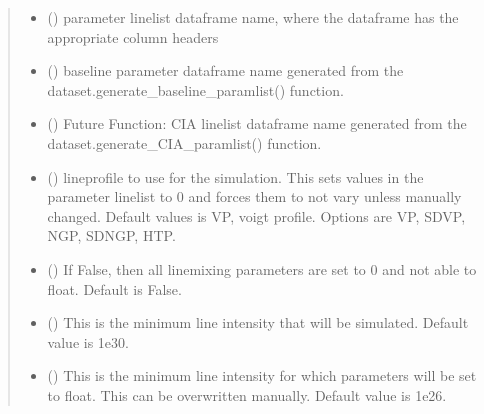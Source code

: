 \documentclass[letterpaper,10pt,english]{sphinxmanual}
\begin{document}
\begin{fulllineitems}
\begin{quote}
\begin{description}
\begin{itemize}
\item {} 
\sphinxAtStartPar
{} () \textendash{} parameter linelist dataframe name, where the dataframe has the appropriate column headers

\item {} 
\sphinxAtStartPar
{} () \textendash{} baseline parameter dataframe name generated from the dataset.generate\_baseline\_paramlist() function.

\item {} 
\sphinxAtStartPar
{} (\sphinxstyleliteralemphasis{\sphinxupquote{, }}) \textendash{} Future Function: CIA linelist dataframe name generated from the dataset.generate\_CIA\_paramlist() function.

\item {} 
\sphinxAtStartPar
{} () \textendash{} lineprofile to use for the simulation. This sets values in the parameter linelist to 0 and forces them to not vary unless manually changed. Default values is VP, voigt profile. Options are VP, SDVP, NGP, SDNGP, HTP.

\item {} 
\sphinxAtStartPar
{} () \textendash{} If False, then all linemixing parameters are set to 0 and not able to float.  Default is False.

\item {} 
\sphinxAtStartPar
{} () \textendash{} This is the minimum line intensity that will be simulated. Default value is 1e\sphinxhyphen{}30.

\item {} 
\sphinxAtStartPar
{} () \textendash{} This is the minimum line intensity for which parameters will be set to float. This can be overwritten manually. Default value is 1e\sphinxhyphen{}26.


\end{itemize}
\end{description}
\end{quote}
\end{fulllineitems}
\end{document}
